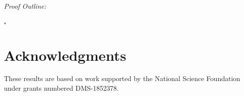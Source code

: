 \documentclass[12pt]{article}
\theoremstyle{definition}
\newenvironment{proofoutline}{\noindent\emph{Proof Outline:}}{\hfill$\square$}
\newcommand{\COE}[2]{CO^{#1}_{e}(#2)}
\newcommand{\BG}{\mathcal{G}}
\begin{document}
\begin{proofoutline}







\end{proofoutline}




\section{Acknowledgments}
These results are based on work supported by the National Science Foundation under grants numbered DMS-1852378.






\end{document}
